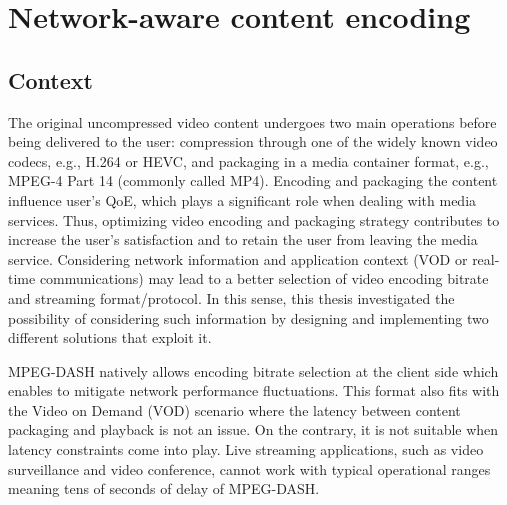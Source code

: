\chapter{Network-aware content encoding}
\label{chap:network-aware}

\section{Context}

The original uncompressed video content undergoes two main operations before being delivered to the user: compression through one of the widely known video codecs, e.g., H.264 or HEVC, and packaging in a media container format, e.g., MPEG-4 Part 14 (commonly called MP4). Encoding and packaging the content influence user's QoE, which plays a significant role when dealing with media services. Thus, optimizing video encoding and packaging strategy contributes to increase the user's satisfaction and to retain the user from leaving the media service. Considering network information and application context (VOD or real-time communications) may lead to a better selection of video encoding bitrate and streaming format/protocol. In this sense, this thesis investigated the possibility of considering such information by designing and implementing two different solutions that exploit it.

MPEG-DASH natively allows encoding bitrate selection at the client side which enables to mitigate network performance fluctuations. This format also fits with the Video on Demand (VOD) scenario where the latency between content packaging and playback is not an issue. On the contrary, it is not suitable when latency constraints come into play. Live streaming applications, such as video surveillance and video conference, cannot work with typical operational ranges meaning tens of seconds of delay of MPEG-DASH.

